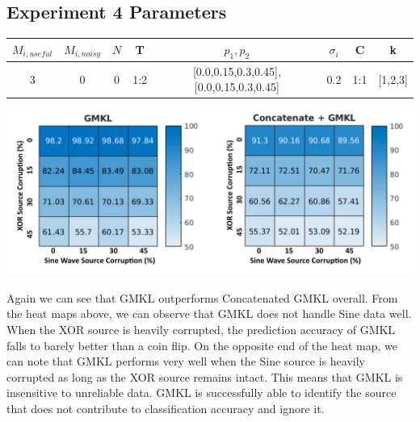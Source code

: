 \documentclass{article}
\begin{document}
\subsection*{Experiment 4 Parameters}
\begin{center}
\begin{tabular}{|c|c|c|c|c|c|c|c|}
\hline
$M_{i,useful}$ & $M_{i, noisy}$ & $N$ & T &  $p_1, p_2$ & $\sigma_i$ & C &  k  \\
\hline
3 & 0 & 0 & 1:2 & [0.0,0.15,0.3,0.45],[0.0,0.15,0.3,0.45] & 0.2 & 1:1 & [1,2,3]  \\
\hline
\end{tabular}
\end{center}


\begin{minipage}{\textwidth}
    \centering
    \includegraphics[width=\textwidth]{SineXORCorrupt.png}
    \label{fig:sinexor_heatmaps}
\end{minipage}


Again we can see that GMKL outperforms Concatenated GMKL overall. From the heat maps above, we can observe that GMKL does not handle Sine data well. When the XOR source is heavily corrupted, the prediction accuracy of GMKL falls to barely better than a coin flip. On the opposite end of the heat map, we can note that GMKL performs very well when the Sine source is heavily corrupted as long as the XOR source remains intact. This means that GMKL is insensitive to unreliable data. GMKL is successfully able to identify the source that does not contribute to classification accuracy and ignore it.
\end{document}

